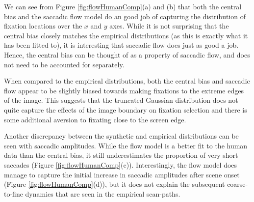 We can see from Figure \ref{fig:flowHumanComp}(a) and (b) that both the central bias and the saccadic flow model do an good job of capturing the distribution of fixation locations over the $x$ and $y$ axes. While it is not surprising that the central bias closely matches the empirical distributions (as this is exactly what it has been fitted to), it is interesting that saccadic flow does just as good a job. Hence, the central bias can be thought of as a property of saccadic flow, and does not need to be accounted for separately. 

When compared to the empirical distributions, both the central bias and saccadic flow appear to be slightly biased towards making fixations to the extreme edges of the image. This suggests that the truncated Gaussian distribution does not quite capture the effects of the image boundary on fixation selection and there is some additional aversion to fixating close to the screen edge. 

Another discrepancy between the synthetic and empirical distributions can be seen with saccadic amplitudes. While the flow model is a better fit to the human data than the central bias, it still underestimates the proportion of very short saccades (Figure \ref{fig:flowHumanComp}(c)). Interestingly, the flow model does manage to capture the initial increase in saccadic amplitudes after scene onset (Figure \ref{fig:flowHumanComp}(d)), but it does not explain the subsequent coarse-to-fine dynamics that are seen in the empirical scan-paths. 


